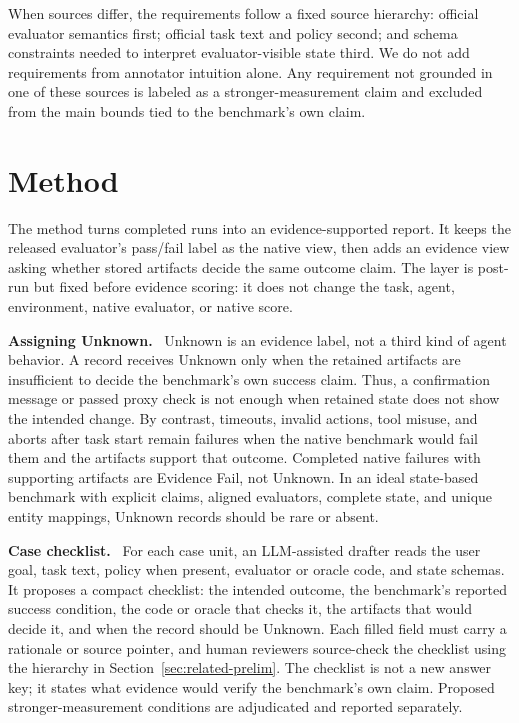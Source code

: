 \documentclass{article}
\newcommand{\evidenceFail}{Evidence Fail\xspace}
\newcommand{\unknownLabel}{Unknown\xspace}
\newcommand{\runin}[1]{\noindent\textbf{#1}\ }
\begin{document}
When sources differ, the requirements follow a fixed source hierarchy:
official evaluator semantics first; official task text and policy second; and
schema constraints needed to interpret evaluator-visible state third. We do not
add requirements from annotator intuition alone. Any requirement not grounded in
one of these sources is labeled as a stronger-measurement claim and excluded
from the main bounds tied to the benchmark's own claim.

\section{Method}
\label{sec:evidence-reporting}
\label{sec:evidence-counting}
\label{sec:method}

The method turns completed runs into an evidence-supported report. It keeps the
released evaluator's pass/fail label as the native view, then adds an evidence
view asking whether stored artifacts decide the same outcome claim. The layer
is post-run but fixed before evidence scoring: it does not change the task,
agent, environment, native evaluator, or native score.

\runin{Assigning Unknown.}
\unknownLabel is an evidence label, not a third kind of agent behavior. A
record receives \unknownLabel only when the retained artifacts are insufficient
to decide the benchmark's own success claim. Thus, a confirmation message or
passed proxy check is not enough when retained state does not show the intended
change. By contrast, timeouts, invalid actions, tool misuse, and aborts after
task start remain failures when the native benchmark would fail them and the
artifacts support that outcome. Completed native failures with supporting
artifacts are \evidenceFail, not \unknownLabel. In an ideal state-based
benchmark with explicit claims, aligned evaluators, complete state, and unique
entity mappings, \unknownLabel records should be rare or absent.

\runin{Case checklist.}
For each case unit, an LLM-assisted drafter reads the user goal, task text,
policy when present, evaluator or oracle code, and state schemas. It
proposes a compact checklist: the intended outcome, the benchmark's reported
success condition, the code or oracle that checks it, the artifacts
that would decide it, and when the record should be \unknownLabel. Each filled
field must carry a rationale or source pointer, and human reviewers source-check
the checklist using the hierarchy in Section~\ref{sec:related-prelim}. The
checklist is not a new answer key; it states what evidence would verify the
benchmark's own claim.
Proposed stronger-measurement conditions are adjudicated and reported
separately.
\end{document}
